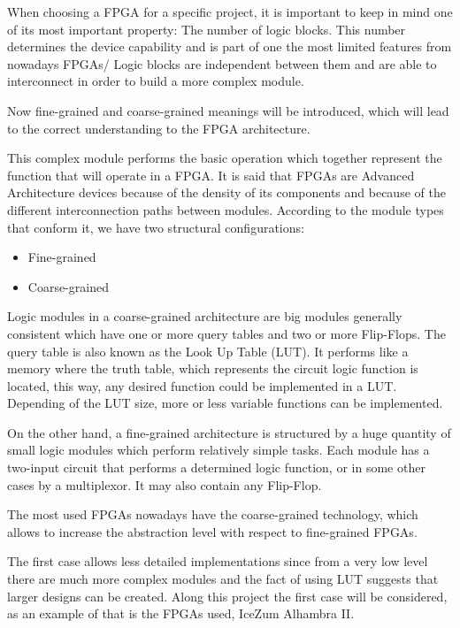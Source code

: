 When choosing a FPGA for a specific project, it is important to keep in mind one of its most important property: The number of logic blocks. This number determines the device capability and is part of one the most limited features from nowadays FPGAs/ Logic blocks are independent between them and are able to interconnect in order to build a more complex module. \newline

Now fine-grained and coarse-grained meanings will be introduced, which will lead to the correct understanding to the FPGA architecture. 

This complex module performs the basic operation which together represent the function that will operate in a FPGA. It is said that FPGAs are Advanced Architecture devices because of the density of its components and because of the different interconnection paths between modules. According to the module types that conform it, we have two structural configurations:
\begin{itemize}
	\item Fine-grained
	\item Coarse-grained
\end{itemize}

Logic modules in a coarse-grained architecture are big modules generally consistent which have one or more query tables and two or more Flip-Flops. The query table is also known as the Look Up Table (LUT). It performs like a memory where the truth table, which represents the circuit logic function is located, this way, any desired function could be implemented in a LUT. Depending of the LUT size, more or less variable functions can be implemented.\newline

On the other hand, a fine-grained architecture is structured by a huge quantity of small logic modules which perform relatively simple tasks. Each module has a two-input circuit that performs a determined logic function, or in some other cases by a multiplexor. It may also contain any Flip-Flop. \newline

The most used FPGAs nowadays have the coarse-grained technology, which allows to increase the abstraction level with respect to fine-grained FPGAs. \newline

The first case allows less detailed implementations since from a very low level there are much more complex modules and the fact of using LUT suggests that larger designs can be created. Along this project the first case will be considered, as an example of that is the FPGAs used, IceZum Alhambra II.\newline

